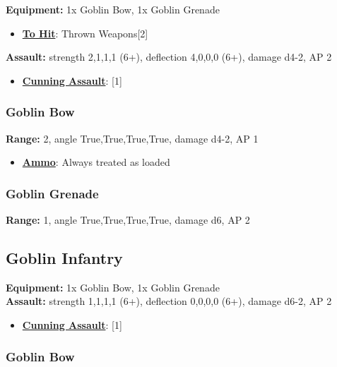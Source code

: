 \documentclass[a4paper,12pt]{article}
\begin{document}
\textbf{Equipment:} 1x Goblin Bow, 1x Goblin Grenade \\

\begin{itemize}
\item \textbf{\hyperref[rule-special-to-hit]{To Hit}}: Thrown Weapons[2]
\end{itemize}
\textbf{Assault:} strength 2,1,1,1 (6+),
deflection 4,0,0,0 (6+),
damage d4-2, AP 2

\begin{itemize}
\item \textbf{\hyperref[rule-special-cunning-assault]{Cunning Assault}}: [1]
\end{itemize}

\subsubsection{Goblin Bow}

\textbf{Range:} 2, angle True,True,True,True, damage d4-2, AP 1

\begin{itemize}
\item \textbf{\hyperref[rule-special-ammo]{Ammo}}: Always treated as loaded
\end{itemize}
\subsubsection{Goblin Grenade}

\textbf{Range:} 1, angle True,True,True,True, damage d6, AP 2

\subsection{Goblin Infantry}

\textbf{Equipment:} 1x Goblin Bow, 1x Goblin Grenade \\

\textbf{Assault:} strength 1,1,1,1 (6+),
deflection 0,0,0,0 (6+),
damage d6-2, AP 2

\begin{itemize}
\item \textbf{\hyperref[rule-special-cunning-assault]{Cunning Assault}}: [1]
\end{itemize}

\subsubsection{Goblin Bow}
\end{document}
